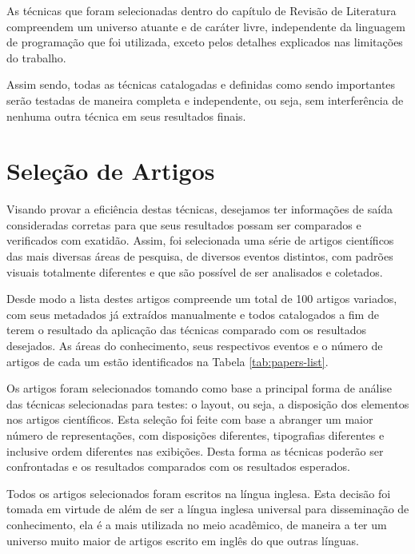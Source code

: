 \documentclass[
	12pt,               %
	openright,          %
	twoside,            %
	a4paper,            %
	english,            %
	brazil              %
	]{abntex2}
\begin{document}
As técnicas que foram selecionadas dentro do capítulo de Revisão de Literatura compreendem um universo atuante e de caráter livre, independente da linguagem de programação que foi utilizada, exceto pelos detalhes explicados nas limitações do trabalho.

Assim sendo, todas as técnicas catalogadas e definidas como sendo importantes serão testadas de maneira completa e independente, ou seja, sem interferência de nenhuma outra técnica em seus resultados finais.


\section{Seleção de Artigos}

Visando provar a eficiência destas técnicas, desejamos ter informações de saída consideradas corretas para que seus resultados possam ser comparados e verificados com exatidão. Assim, foi selecionada uma série de artigos científicos das mais diversas áreas de pesquisa, de diversos eventos distintos, com padrões visuais totalmente diferentes e que são possível de ser analisados e coletados.


Desde modo a lista destes artigos compreende um total de 100 artigos variados, com seus metadados já extraídos manualmente e todos catalogados a fim de terem o resultado da aplicação das técnicas comparado com os resultados desejados. As áreas do conhecimento, seus respectivos eventos e o número de artigos de cada um estão identificados na Tabela \ref{tab:papers-list}.

Os artigos foram selecionados tomando como base a principal forma de análise das técnicas selecionadas para testes: o layout, ou seja, a disposição dos elementos nos artigos científicos. Esta seleção foi feite com base a abranger um maior número de representações, com disposições diferentes, tipografias diferentes e inclusive ordem diferentes nas exibições. Desta forma as técnicas poderão ser confrontadas e os resultados comparados com os resultados esperados.


Todos os artigos selecionados foram escritos na língua inglesa. Esta decisão foi tomada em virtude de além de ser a língua inglesa universal para disseminação de conhecimento, ela é a mais utilizada no meio acadêmico, de maneira a ter um universo muito maior de artigos escrito em inglês do que outras línguas.
\end{document}
